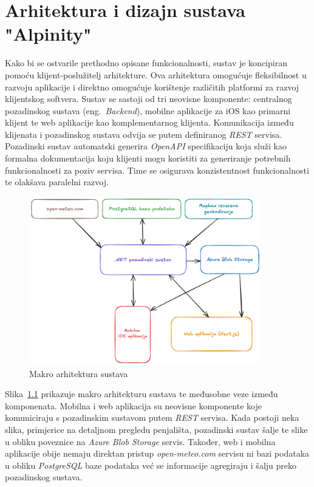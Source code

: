 \chapter{Arhitektura i dizajn sustava "Alpinity"}

Kako bi se ostvarile prethodno opisane funkcionalnosti, sustav je koncipiran pomoću klijent-poslužitelj arhitekture. Ova arhitektura omogućuje fleksibilnost u razvoju aplikacije i direktno omogućuje korištenje različitih platformi za razvoj klijentskog softvera. Sustav se sastoji od tri neovisne komponente: centralnog pozadinskog sustava (eng. \textit{Backend}), mobilne aplikacije za iOS kao primarni klijent te web aplikacije kao komplementarnog klijenta. 
Komunikacija između klijenata i pozadinskog sustava odvija se putem definiranog \textit{REST} servisa. Pozadinski sustav automatski generira \textit{OpenAPI} specifikaciju koja služi kao formalna dokumentacija koju klijenti mogu koristiti za generiranje potrebnih funkcionalnosti za poziv servisa. Time se osigurava konzistentnost funkcionalnosti te olakšava paralelni razvoj.

\begin{figure}[H]
    \centering
    \includegraphics[width=0.9\textwidth]{images/arhitektura/general_arch.png}
    \caption{Makro arhitektura sustava}
    \label{fig:arhitektura}
\end{figure}

Slika~\ref{fig:arhitektura} prikazuje makro arhitekturu sustava te međusobne veze između komponenata. Mobilna i web aplikacija su neovisne komponente koje komuniciraju s pozadinskim sustavom putem \textit{REST} servisa. Kada postoji neka slika, primjerice na detaljnom pregledu penjališta, pozadinski sustav šalje te slike u obliku poveznice na \textit{Azure Blob Storage} servis. Također, web i mobilna aplikacije obije nemaju direktan pristup \textit{open-meteo.com} servisu ni bazi podataka u obliku \textit{PostgreSQL} baze podataka već se informacije agregiraju i šalju preko pozadinskog sustava.

